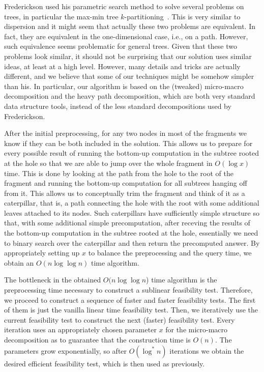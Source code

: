 \documentclass[11pt,a4paper]{article}
\theoremstyle{definition}
\theoremstyle{remark}
\begin{document}
Frederickson used his parametric search method to solve several problems on trees, in particular
the max-min tree $k$-partitioning~\cite{Frederickson1991}. This is very similar to dispersion and it might
seem that actually these two problems are equivalent. In fact, they are equivalent in the one-dimensional case,
i.e., on a path. However, such equivalence seems problematic for general trees. %
Given that these two problems look similar, it should not be surprising that our solution uses similar
ideas, at least at a high level. However, many details and tricks are actually different, and we believe
that some of our techniques might be somehow simpler than his. %
In particular, our algorithm is based on the (tweaked) micro-macro decomposition and the heavy path
decomposition, which are both very standard data structure tools, instead of the less standard
decompositions used by Frederickson.%

After the initial preprocessing, for any two nodes in most of the fragments we know if they can be
both included in the solution. This allows us to prepare for every possible result of running the
bottom-up computation in the subtree rooted at the hole so that we are able to jump over the whole
fragment in $O(\log x)$ time. This is done by looking at the path from the hole to the root of the
fragment and running the bottom-up computation for all subtrees hanging off from it. This allows
us to conceptually trim the fragment and think of it as a caterpillar, that is, a path connecting
the hole with the root with some additional leaves attached to its nodes. Such caterpillars have
sufficiently simple structure so that, with some additional simple precomputation, after receving
the results of the bottom-up computation in the subtree rooted at the hole, essentially we need
to binary search over the caterpillar and then return the precomputed answer. By appropriately
setting up $x$ to balance the preprocessing and the query time, we obtain an $O(n\log\log n)$
time algorithm.

The bottleneck in the obtained $O(n\log\log n$) time algorithm is the preprocessing time necessary
to construct a sublinear feasibility test. Therefore, we proceed to construct a sequence of
faster and faster feasibility tests. The first of them is just the vanilla linear time feasibility test.
Then, we iteratively use the current feasibility test to construct the next (faster) feasibility test.
Every iteration uses an appropriately chosen parameter $x$ for the micro-macro decomposition
as to guarantee that the construction time is $O(n)$. The parameters grow exponentially,
so after $O(\log^{*}n)$ iterations we obtain the desired efficient feasibility test, which is then
used as previously.
\end{document}
